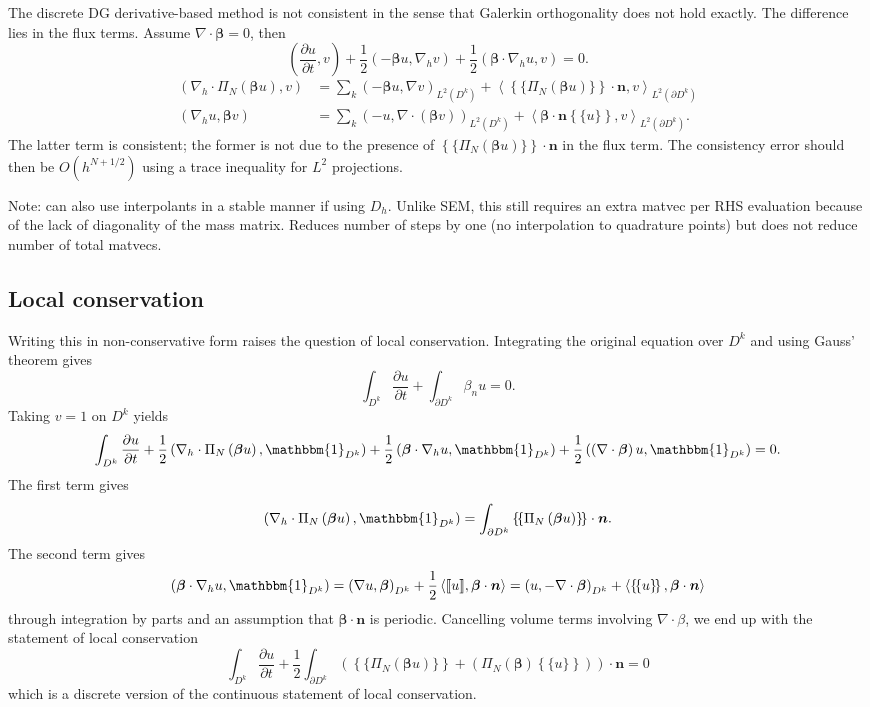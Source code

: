 \documentclass[preprint,10pt]{article}
\theoremstyle{definition}
\theoremstyle{lemma}
\newcommand{\bbm}[1]{\mathbbm{#1}}
\newcommand{\pd}[2]{\frac{\partial#1}{\partial#2}}
\newcommand{\LRp}[1]{\left( #1 \right)}
\newcommand{\LRa}[1]{\left\langle #1 \right\rangle}
\newcommand{\LRc}[1]{\left\{ #1 \right\}}
\newcommand{\Grad} {\ensuremath{\nabla}}
\newcommand{\Div} {\ensuremath{\nabla\cdot}}
\newcommand{\jump}[1] {\ensuremath{\llbracket#1\rrbracket}}
\newcommand{\avg}[1] {\ensuremath{\LRc{\!\{#1\}\!}}}
\newcommand{\LK}{L^2\LRp{D^k}}
\newcommand{\LdK}{L^2\LRp{\partial D^k}}
\begin{document}
The discrete DG derivative-based method is not consistent in the sense that Galerkin orthogonality does not hold exactly.  The difference lies in the flux terms.  Assume $\Div \bm{\beta} = 0$, then
\[
\LRp{\pd{u}{t},v} + \frac{1}{2}\LRp{-{ \bm{\beta}u},\Grad_h v} + \frac{1}{2}\LRp{\bm{\beta}\cdot\Grad_h u,v} = 0.
\]
\begin{align*}
\LRp{\Grad_h\cdot \Pi_N\LRp{ \bm{\beta}u},v} &= \sum_{k} \LRp{-\bm{\beta}u, \Grad v}_{\LK} + \LRa{\avg{\Pi_N\LRp{\bm{\beta} u}}\cdot \bm{n},v}_{\LdK}\\
\LRp{\Grad_h u,\bm{\beta}v} &= \sum_{k} \LRp{-u, \Grad \cdot \LRp{\bm{\beta}v}}_{\LK} + \LRa{\bm{\beta}\cdot\bm{n}\avg{u},v}_{\LdK}.
\end{align*}
The latter term is consistent; the former is not due to the presence of $\avg{\Pi_N\LRp{\bm{\beta} u}}\cdot \bm{n}$ in the flux term.  The consistency error should then be $O(h^{N+1/2})$ using a trace inequality for $L^2$ projections.  

Note: can also use interpolants in a stable manner if using $D_h$.  Unlike SEM, this still requires an extra matvec per RHS evaluation because of the lack of diagonality of the mass matrix.  Reduces number of steps by one (no interpolation to quadrature points) but does not reduce number of total matvecs.  

\subsection{Local conservation}

Writing this in non-conservative form raises the question of local conservation.  Integrating the original equation over $D^k$ and using Gauss' theorem gives
\[
\int_{D^k}\pd{u}{t} + \int_{\partial D^k} \beta_n u = 0.
\]
Taking $v = 1$ on $D^k$ yields
\[
\int_{D^k}\pd{u}{t} + \frac{1}{2}\LRp{\Grad_h\cdot \Pi_N \LRp{ \bm{\beta}u},\bbm{1}_{D^k}} + \frac{1}{2}\LRp{\bm{\beta}\cdot\Grad_h u,\bbm{1}_{D^k}} + \frac{1}{2}\LRp{\LRp{\Grad\cdot \bm{\beta}} u,\bbm{1}_{D^k}} = 0.
\]
The first term gives
\[
\LRp{\Grad_h\cdot \Pi_N \LRp{ \bm{\beta}u},\bbm{1}_{D^k}} = \int_{\partial D^k} \avg{\Pi_N\LRp{\bm{\beta}u}}\cdot\bm{n}.
\]
The second term gives
\[
\LRp{\bm{\beta}\cdot\Grad_h u,\bbm{1}_{D^k}} = \LRp{\Grad u,\bm{\beta}}_{D^k} + \frac{1}{2}\LRa{\jump{u},\bm{\beta}\cdot\bm{n}} = \LRp{u,-\Grad \cdot \bm{\beta}}_{D^k} + \LRa{\avg{u},\bm{\beta}\cdot\bm{n}}
\]
through integration by parts and an assumption that $\bm{\beta}\cdot \bm{n}$ is periodic.  Cancelling volume terms involving $\Grad\cdot \beta$, we end up with the statement of local conservation 
\[
\int_{D^k} \pd{u}{t}  + \frac{1}{2}\int_{\partial D^k} \LRp{\avg{\Pi_N\LRp{\bm{\beta}u}} + \LRp{\Pi_N\LRp{\bm{\beta}}\avg{u}}}\cdot\bm{n} = 0
\]
which is a discrete version of the continuous statement of local conservation.
\end{document}
